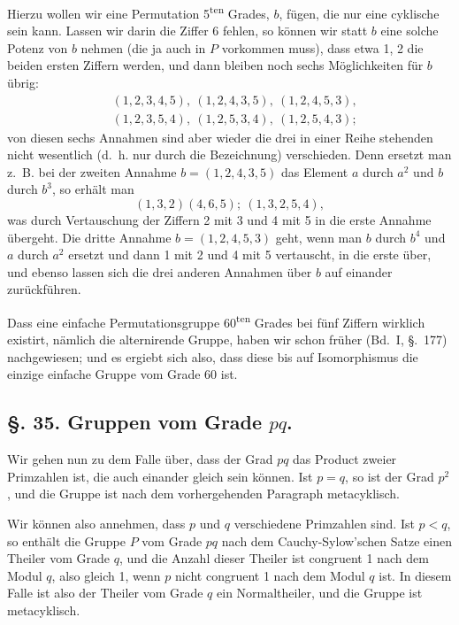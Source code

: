 \documentclass[12pt,a4paper]{article}
\theoremstyle{plain}
\theoremstyle{definition}
\theoremstyle{remark}
\begin{document}
Hierzu wollen wir eine Permutation 5\textsuperscript{ten} Grades, $b$, fügen, die nur eine cyklische sein kann. Lassen wir darin die Ziffer 6 fehlen, so können wir statt $b$ eine solche Potenz von $b$ nehmen (die ja auch in $P$ vorkommen muss), dass etwa 1, 2 die beiden ersten Ziffern werden, und dann bleiben noch sechs Möglichkeiten für $b$ übrig:
\begin{align*}
&(1,2,3,4,5),\ (1,2,4,3,5),\ (1,2,4,5,3),\\
&(1,2,3,5,4),\ (1,2,5,3,4),\ (1,2,5,4,3);
\end{align*}
von diesen sechs Annahmen sind aber wieder die drei in einer Reihe stehenden nicht wesentlich (d.~h. nur durch die Bezeichnung) verschieden. Denn ersetzt man z.~B. bei der zweiten Annahme $b = (1,2,4,3,5)$ das Element $a$ durch $a^{2}$ und $b$ durch $b^{3}$, so erhält man
\[
(1,3,2)(4,6,5);\ (1,3,2,5,4),
\]
was durch Vertauschung der Ziffern 2 mit 3 und 4 mit 5 in die erste Annahme übergeht. Die dritte Annahme $b = (1,2,4,5,3)$ geht, wenn man $b$ durch $b^{4}$ und $a$ durch $a^{2}$ ersetzt und dann 1 mit 2 und 4 mit 5 vertauscht, in die erste über, und ebenso lassen sich die drei anderen Annahmen über $b$ auf einander zurückführen.

Dass eine einfache Permutationsgruppe 60\textsuperscript{ten} Grades bei fünf Ziffern wirklich existirt, nämlich die alternirende Gruppe, haben wir schon früher (Bd.~I, \S.~177) nachgewiesen; und es ergiebt sich also, dass diese bis auf Isomorphismus die einzige einfache Gruppe vom Grade 60 ist.


\subsection*{\S. 35. Gruppen vom Grade $pq$.}

Wir gehen nun zu dem Falle über, dass der Grad $pq$ das Product zweier Primzahlen ist, die auch einander gleich sein können. Ist $p = q$, so ist der Grad $p^{2}$, und die Gruppe ist nach dem vorhergehenden Paragraph metacyklisch.

Wir können also annehmen, dass $p$ und $q$ verschiedene Primzahlen sind. Ist $p < q$, so enthält die Gruppe $P$ vom Grade $pq$ nach dem Cauchy-Sylow'schen Satze einen Theiler vom Grade $q$, und die Anzahl dieser Theiler ist congruent 1 nach dem Modul $q$, also gleich 1, wenn $p$ nicht congruent 1 nach dem Modul $q$ ist. In diesem Falle ist also der Theiler vom Grade $q$ ein Normaltheiler, und die Gruppe ist metacyklisch.
\end{document}
